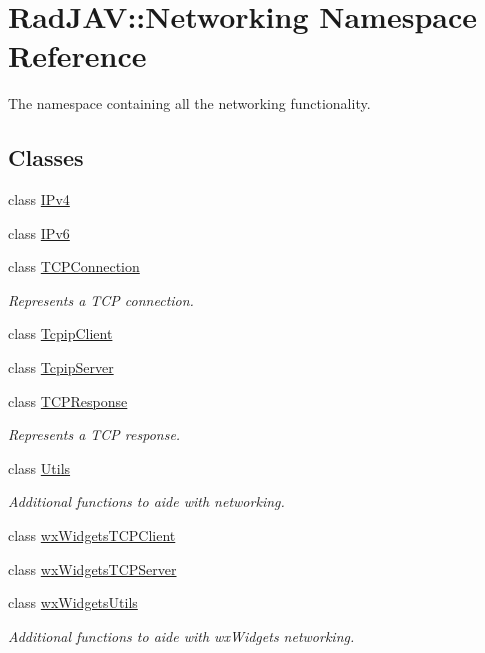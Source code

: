 \hypertarget{namespace_rad_j_a_v_1_1_networking}{}\section{Rad\+J\+AV\+:\+:Networking Namespace Reference}
\label{namespace_rad_j_a_v_1_1_networking}


The namespace containing all the networking functionality.  


\subsection*{Classes}
\begin{DoxyCompactItemize}
\item 
class \hyperlink{class_rad_j_a_v_1_1_networking_1_1_i_pv4}{I\+Pv4}
\item 
class \hyperlink{class_rad_j_a_v_1_1_networking_1_1_i_pv6}{I\+Pv6}
\item 
class \hyperlink{class_rad_j_a_v_1_1_networking_1_1_t_c_p_connection}{T\+C\+P\+Connection}
\begin{DoxyCompactList}\small\item\em Represents a T\+CP connection. \end{DoxyCompactList}\item 
class \hyperlink{class_rad_j_a_v_1_1_networking_1_1_tcpip_client}{Tcpip\+Client}
\item 
class \hyperlink{class_rad_j_a_v_1_1_networking_1_1_tcpip_server}{Tcpip\+Server}
\item 
class \hyperlink{class_rad_j_a_v_1_1_networking_1_1_t_c_p_response}{T\+C\+P\+Response}
\begin{DoxyCompactList}\small\item\em Represents a T\+CP response. \end{DoxyCompactList}\item 
class \hyperlink{class_rad_j_a_v_1_1_networking_1_1_utils}{Utils}
\begin{DoxyCompactList}\small\item\em Additional functions to aide with networking. \end{DoxyCompactList}\item 
class \hyperlink{class_rad_j_a_v_1_1_networking_1_1wx_widgets_t_c_p_client}{wx\+Widgets\+T\+C\+P\+Client}
\item 
class \hyperlink{class_rad_j_a_v_1_1_networking_1_1wx_widgets_t_c_p_server}{wx\+Widgets\+T\+C\+P\+Server}
\item 
class \hyperlink{class_rad_j_a_v_1_1_networking_1_1wx_widgets_utils}{wx\+Widgets\+Utils}
\begin{DoxyCompactList}\small\item\em Additional functions to aide with wx\+Widgets networking. \end{DoxyCompactList}\end{DoxyCompactItemize}
